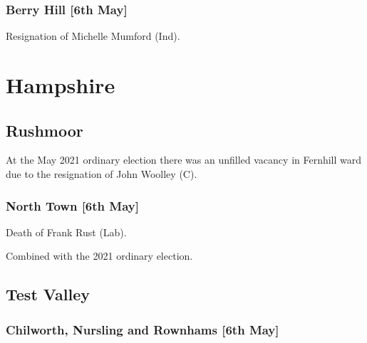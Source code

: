 \documentclass[a4paper,openany]{book}
\begin{document}
\begin{resultsiii}
\subsubsection*{Berry Hill \hspace*{\fill}\nolinebreak[1]%
	\enspace\hspace*{\fill}
	[6th May]}


Resignation of Michelle Mumford (Ind).

\section{Hampshire}

\subsection*{Rushmoor}

At the May 2021 ordinary election there was an unfilled vacancy in Fernhill ward due to the resignation of John Woolley (C).

\subsubsection*{North Town \hspace*{\fill}\nolinebreak[1]%
	\enspace\hspace*{\fill}
	[6th May]}


Death of Frank Rust (Lab).

Combined with the 2021 ordinary election.

\subsection*{Test Valley}

\subsubsection*{Chilworth, Nursling and Rownhams \hspace*{\fill}\nolinebreak[1]%
	\enspace\hspace*{\fill}
	[6th May]}



\end{resultsiii}
\end{document}
